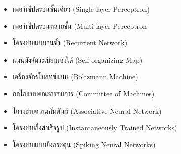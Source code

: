 \begin{itemize}
    \item เพอร์เซ็ปตรอนชั้นเดียว (Single-layer Perceptron)
    \item เพอร์เซ็ปตรอนหลายชั้น (Multi-layer Perceptron
    \item โครงข่ายแบบวนซ้ำ (Recurrent Network)
    \item แผนผังจัดระเบียบเองได้ (Self-organizing Map)
    \item เครื่องจักรโบลทซ์แมน (Boltzmann Machine)
    \item กลไกแบบคณะกรรมการ (Committee of Machines)
    \item โครงข่ายความสัมพันธ์ (Associative Neural Network)
    \item โครงข่ายกึ่งสำเร็จรูป (Instantaneously Trained Networks)
    \item โครงข่ายแบบยิงกระตุ้น (Spiking Neural Networks) 
\end{itemize}
